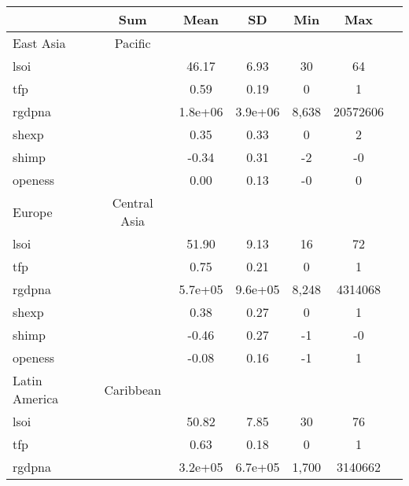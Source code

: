 {
\def\sym#1{\ifmmode^{#1}\else\(^{#1}\)\fi}
\begin{tabular}{l*{1}{cccccc}}
\hline\hline
            &         Sum&        Mean&          SD&         Min&         Max&            \\
\hline
East Asia & Pacific&            &            &            &            &            &            \\
lsoi        &            &       46.17&        6.93&          30&          64&            \\
tfp         &            &        0.59&        0.19&           0&           1&            \\
rgdpna      &            &     1.8e+06&     3.9e+06&       8,638&    20572606&            \\
shexp       &            &        0.35&        0.33&           0&           2&            \\
shimp       &            &       -0.34&        0.31&          -2&          -0&            \\
openess     &            &        0.00&        0.13&          -0&           0&            \\
\hline
Europe & Central Asia&            &            &            &            &            &            \\
lsoi        &            &       51.90&        9.13&          16&          72&            \\
tfp         &            &        0.75&        0.21&           0&           1&            \\
rgdpna      &            &     5.7e+05&     9.6e+05&       8,248&     4314068&            \\
shexp       &            &        0.38&        0.27&           0&           1&            \\
shimp       &            &       -0.46&        0.27&          -1&          -0&            \\
openess     &            &       -0.08&        0.16&          -1&           1&            \\
\hline
Latin America & Caribbean&            &            &            &            &            &            \\
lsoi        &            &       50.82&        7.85&          30&          76&            \\
tfp         &            &        0.63&        0.18&           0&           1&            \\
rgdpna      &            &     3.2e+05&     6.7e+05&       1,700&     3140662&            \\

\end{tabular}}
